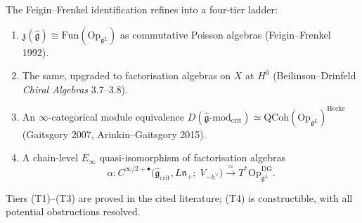 \documentclass[11pt]{article}
\begin{document}
\begin{theorem}
\label{thm:ff-hierarchy}
The Feigin--Frenkel identification refines into a four-tier ladder:
\begin{enumerate}
\item[(T1)] $\mathfrak{z}(\widehat{\mathfrak{g}}) \cong \mathrm{Fun}(\mathrm{Op}_{\mathfrak{g}^L})$
as commutative Poisson algebras (Feigin--Frenkel 1992).
\item[(T2)] The same, upgraded to factorisation algebras on $X$ at
$H^0$ (Beilinson--Drinfeld \emph{Chiral Algebras} 3.7--3.8).
\item[(T3)] An $\infty$-categorical module equivalence
$D(\widehat{\mathfrak{g}}\text{-}\mathrm{mod}_{\mathrm{crit}})
\simeq \mathrm{QCoh}(\mathrm{Op}_{\mathfrak{g}^L})^{\mathrm{Hecke}}$
(Gaitsgory 2007, Arinkin--Gaitsgory 2015).
\item[(T4)] A chain-level $E_{\infty}$ quasi-isomorphism of
factorisation algebras
\[
  \alpha : C^{\infty/2+\bullet}\bigl(\widehat{\mathfrak{g}}_{\mathrm{crit}},
           L\mathfrak{n}_+;\; V_{-h^{\vee}}\bigr)
         \xrightarrow{\;\simeq\;}
           T^*\mathrm{Op}_{\mathfrak{g}^L}^{\mathrm{DG}}.
\]
\end{enumerate}
Tiers (T1)--(T3) are proved in the cited literature; (T4) is
constructible, with all potential obstructions resolved.
\end{theorem}
\end{document}
